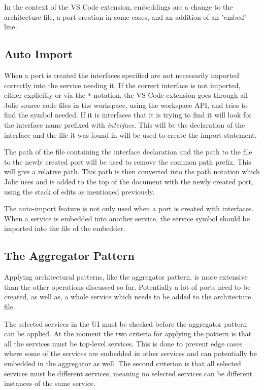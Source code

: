 In the context of the VS Code extension, embeddings are a change to the architecture file, a port creation in some cases, and an addition of an "embed" line.

\subsection{Auto Import}
When a port is created the interfaces specified are not necessarily imported correctly into the service needing it.
If the correct interface is not imported, either explicitly or via the \texttt{*}-notation,
the VS Code extension goes through all Jolie source code files in the workspace, using the workspace API, and tries to find the symbol needed. If it is interfaces that it is trying to find
it will look for the interface name prefixed with \emph{interface}. This will be the declaration of the interface and the file it was found in will be used to create the import statement.

The path of the file containing the interface declaration and the path to the file to the newly created port will be used to remove the common path prefix. This will give a relative path.
This path is then converted into the path notation which Jolie uses and is added to the top of the document with the newly created port, using the stack of edits as mentioned previously.

The auto-import feature is not only used when a port is created with interfaces. When a service is embedded into another service, the service symbol should be imported into the file of the embedder.

\subsection{The Aggregator Pattern}
Applying architectural patterns, like the aggregator pattern, is more extensive than the other operations discussed so far.
Potentially a lot of ports need to be created, as well as, a whole service which needs to be added to the architecture file.

The selected services in the UI must be checked before the aggregator pattern can be applied. At the moment the two criteria for applying the pattern is that all the services must be top-level services. This is done to 
prevent edge cases where some of the services are embedded in other services and can potentially be embedded in the aggregator as well. 
The second criterion is that all selected services must be different services, meaning no selected services can be different instances of the same service.

